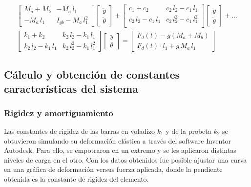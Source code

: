 \begin{equation}\label{eq:mov_matriz}
\begin{split}
\begin{bmatrix}
	M_a + M_b	& -M_a\,l_1 \\
	-M_a\,l_1	& I_{gb} - M_a\,l_1^2
\end{bmatrix}
\begin{bmatrix}
	\ddot{y}\\
	\ddot{\theta}
\end{bmatrix} +
\begin{bmatrix}
	c_1 + c_2			& c_2\,l_2 - c_1\,l_1\\
	c_2\,l_2 - c_1\,l_1	& c_2\,l_2^2 - c_1\,l_1^2\\
\end{bmatrix}
\begin{bmatrix}
	\dot{y}\\
	\dot{\theta}
\end{bmatrix} + \dots \\
\begin{bmatrix}
	k_1 + k_2			& k_2\,l_2 - k_1\,l_1\\
	k_2\,l_2 - k_1\,l_1	& k_2\,l_2^2 - k_1\,l_1^2
\end{bmatrix}
\begin{bmatrix}
	y\\
	\theta
\end{bmatrix} =
\begin{bmatrix}
	F_d(t) - g(M_a + M_b)\\
	F_d(t)\cdot l_1 + g\,M_a\,l_1
\end{bmatrix}
\end{split}
\end{equation}

\subsection{Cálculo y obtención de constantes características del sistema}
 
\subsubsection{Rigidez y amortiguamiento} Las constantes de rigidez de las barras en voladizo $k_1$ y de la probeta $k_2$ se obtuvieron simulando su deformación elástica a través del software Inventor Autodesk. Para ello, se empotraron en un extremo y se les aplicaron distintas niveles de carga en el otro. Con los datos obtenidos fue posible ajustar una curva en una gráfica de deformación versus fuerza aplicada, donde la pendiente obtenida es la constante de rigidez del elemento. 

